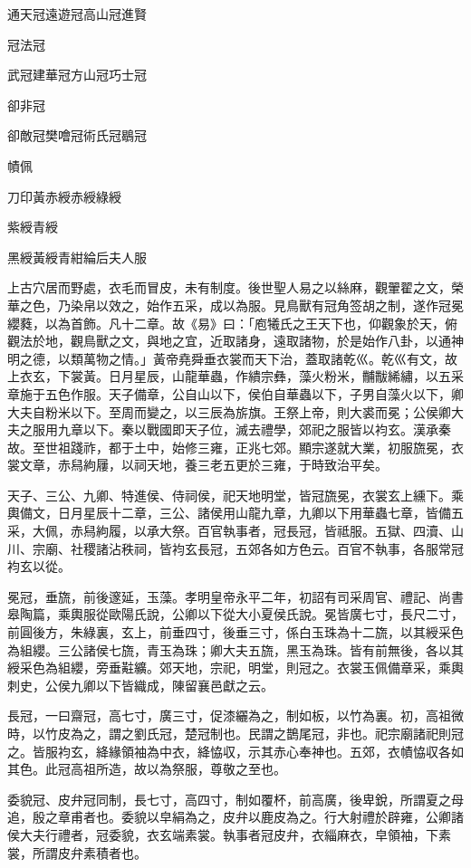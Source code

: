 
\begin{pinyinscope}
通天冠遠遊冠高山冠進賢

冠法冠

武冠建華冠方山冠巧士冠

卻非冠

卻敵冠樊噲冠術氏冠鶡冠

幘佩

刀印黃赤綬赤綬綠綬

紫綬青綬

黑綬黃綬青紺綸后夫人服

上古穴居而野處，衣毛而冒皮，未有制度。後世聖人易之以絲麻，觀翬翟之文，榮華之色，乃染帛以效之，始作五采，成以為服。見鳥獸有冠角签胡之制，遂作冠冕纓蕤，以為首飾。凡十二章。故《易》曰：「庖犧氏之王天下也，仰觀象於天，俯觀法於地，觀鳥獸之文，與地之宜，近取諸身，遠取諸物，於是始作八卦，以通神明之德，以類萬物之情。」黃帝堯舜垂衣裳而天下治，蓋取諸乾巛。乾巛有文，故上衣玄，下裳黃。日月星辰，山龍華蟲，作繢宗彝，藻火粉米，黼黻絺繡，以五采章施于五色作服。天子備章，公自山以下，侯伯自華蟲以下，子男自藻火以下，卿大夫自粉米以下。至周而變之，以三辰為旂旗。王祭上帝，則大裘而冕；公侯卿大夫之服用九章以下。秦以戰國即天子位，滅去禮學，郊祀之服皆以袀玄。漢承秦故。至世祖踐祚，都于土中，始修三雍，正兆七郊。顯宗遂就大業，初服旒冕，衣裳文章，赤舄絇屨，以祠天地，養三老五更於三雍，于時致治平矣。

天子、三公、九卿、特進侯、侍祠侯，祀天地明堂，皆冠旒冕，衣裳玄上纁下。乘輿備文，日月星辰十二章，三公、諸侯用山龍九章，九卿以下用華蟲七章，皆備五采，大佩，赤舄絇履，以承大祭。百官執事者，冠長冠，皆祗服。五獄、四瀆、山川、宗廟、社稷諸沾秩祠，皆袀玄長冠，五郊各如方色云。百官不執事，各服常冠袀玄以從。

冕冠，垂旒，前後邃延，玉藻。孝明皇帝永平二年，初詔有司采周官、禮記、尚書皋陶篇，乘輿服從歐陽氏說，公卿以下從大小夏侯氏說。冕皆廣七寸，長尺二寸，前圓後方，朱綠裏，玄上，前垂四寸，後垂三寸，係白玉珠為十二旒，以其綬采色為組纓。三公諸侯七旒，青玉為珠；卿大夫五旒，黑玉為珠。皆有前無後，各以其綬采色為組纓，旁垂黈纊。郊天地，宗祀，明堂，則冠之。衣裳玉佩備章采，乘輿刺史，公侯九卿以下皆織成，陳留襄邑獻之云。

長冠，一曰齋冠，高七寸，廣三寸，促漆纚為之，制如板，以竹為裏。初，高祖微時，以竹皮為之，謂之劉氏冠，楚冠制也。民謂之鵲尾冠，非也。祀宗廟諸祀則冠之。皆服袀玄，絳緣領袖為中衣，絳恊収，示其赤心奉神也。五郊，衣幘恊収各如其色。此冠高祖所造，故以為祭服，尊敬之至也。

委貌冠、皮弁冠同制，長七寸，高四寸，制如覆杯，前高廣，後卑銳，所謂夏之母追，殷之章甫者也。委貌以皁絹為之，皮弁以鹿皮為之。行大射禮於辟雍，公卿諸侯大夫行禮者，冠委貌，衣玄端素裳。執事者冠皮弁，衣緇麻衣，皁領袖，下素裳，所謂皮弁素積者也。


\end{pinyinscope}
